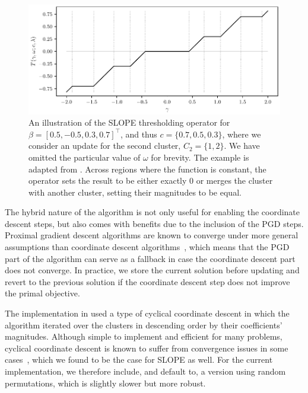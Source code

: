 \documentclass[article]{jss}
\makeatletter
\let\natwidth\Gin@nat@width
\makeatother
\begin{document}
\begin{algorithm}[tp]
{{      
    }
  }

\end{algorithm}

\begin{figure}[t]
  \centering
  \includegraphics[width=\natwidth]{images/slope-thresholding.pdf}
  \caption{
  An illustration of the SLOPE thresholding operator for \(\beta = [0.5,
  -0.5, 0.3, 0.7]^\intercal\), and thus $c = \{0.7, 0.5, 0.3\}$, where we consider
  an update for the second cluster, \(C_2 = \{1, 2\}\). We have omitted the
  particular value of $\omega$ for brevity. The example is adapted from
  \citet{larsson2023}. Across regions where the function is constant, the
  operator sets the result to be either exactly 0 or merges the cluster
  with another cluster, setting their magnitudes to be equal.
  }
  \label{fig:slope-thresholding}
\end{figure}

The hybrid nature of the algorithm is not only useful for enabling the
coordinate descent steps, but also comes with benefits due to the inclusion of
the PGD steps. Proximal gradient descent algorithms are known to converge under
more general assumptions than coordinate descent algorithms~\citep{wright2015},
which means that the PGD part of the algorithm can serve as a fallback in case
the coordinate descent part does not converge. In practice, we store the
current solution before updating and revert to the previous solution if the
coordinate descent step does not improve the primal objective.

The implementation in \citet{larsson2023} used a type of cyclical coordinate
descent in which the algorithm iterated over the clusters in descending order
by their coefficients' magnitudes. Although simple to implement and efficient
for many problems, cyclical coordinate descent is known to suffer from
convergence issues in some cases~\citep{wright2015}, which we found to be the
case for SLOPE as well. For the current implementation, we therefore include,
and default to, a version using random permutations, which is slightly slower
but more robust.
\end{document}
